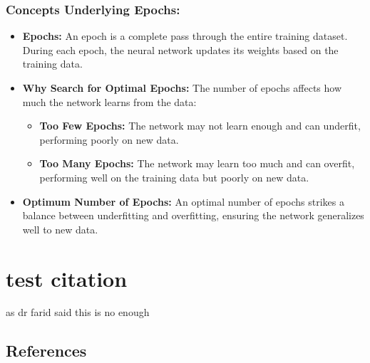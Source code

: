 \documentclass[
  super,
  review,
  3p]{elsarticle}
\providecommand{\tightlist}{%
  \setlength{\itemsep}{0pt}\setlength{\parskip}{0pt}}\usepackage{longtable,booktabs,array}
\begin{document}
\subsubsection{Concepts Underlying
Epochs:}\label{concepts-underlying-epochs}

\begin{itemize}
\tightlist
\item
  \textbf{Epochs:} An epoch is a complete pass through the entire
  training dataset. During each epoch, the neural network updates its
  weights based on the training data.
\item
  \textbf{Why Search for Optimal Epochs:} The number of epochs affects
  how much the network learns from the data:

  \begin{itemize}
  \tightlist
  \item
    \textbf{Too Few Epochs:} The network may not learn enough and can
    underfit, performing poorly on new data.
  \item
    \textbf{Too Many Epochs:} The network may learn too much and can
    overfit, performing well on the training data but poorly on new
    data.
  \end{itemize}
\item
  \textbf{Optimum Number of Epochs:} An optimal number of epochs strikes
  a balance between underfitting and overfitting, ensuring the network
  generalizes well to new data.
\end{itemize}

\section{test citation}\label{test-citation}

as dr farid said \citep{Dirac1953888} this is no enough

\subsection*{References}\label{references}

\renewcommand{\bibsection}{}

\end{document}
